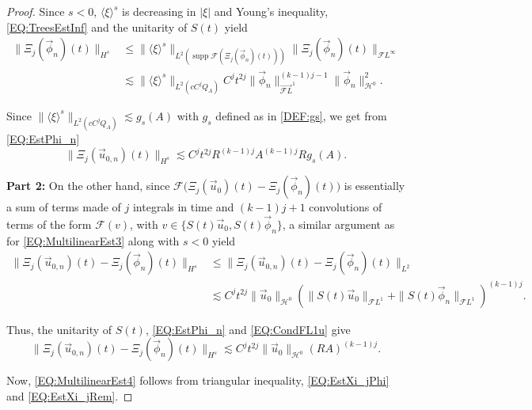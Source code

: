 \documentclass[letterpaper, 11pt,  reqno]{amsart}
\DeclareMathOperator*{\supp}{supp}
\newcommand{\1}{\hspace{0.5mm}\text{I}\hspace{0.5mm}}
\newcommand{\noi}{\noindent}
\newcommand{\FL}{\mathcal{F}L} %
\newcommand{\FLv}{\overrightarrow{\mathcal{F}L}}
\renewcommand{\H}{\mathcal{H}}
\newcommand{\F}{\mathcal{F}}
\newcommand{\les}{\lesssim}
\newcommand{\jb}[1]
{\langle #1 \rangle}
\numberwithin{equation}{section}
\numberwithin{theorem}{section}
\newcommand{\abs}[1]{\lvert#1\rvert}
\begin{document}
\begin{proof}
\noi Since $s < 0$, $\jb{\xi}^s$ is decreasing in $\abs{\xi}$ and Young's inequality, \eqref{EQ:TreesEstInf} and the unitarity of $S(t)$ yield
\begin{align*}
\| \Xi_j (\vec{\phi}_{n})(t) \|_{H^s} & \leq \| \jb{\xi}^s \|_{L^2 (\supp \F( \Xi_j (\vec{\phi}_{n})(t) ) ) } \| \Xi_j (\vec{\phi}_{n})(t) \|_{\FL^\infty} \\
	& \les \| \jb{\xi}^s \|_{L^2 (c C^j Q_A) } C^j t^{2j} \| \vec{\phi}_n \|^{(k-1)j-1}_{\FLv^1} \| \vec{\phi}_n \|^2_{\H^0}.
\end{align*}

\noi Since $\| \jb{\xi}^s \|_{L^2 (c C^j Q_A) } \les g_s(A)$ with $g_s$ defined as in \eqref{DEF:gs}, we get from \eqref{EQ:EstPhi_n}
\begin{equation}
\label{EQ:EstXi_jPhi}
\| \Xi_j (\vec{u}_{0,n})(t) \|_{H^s} \les C^j t^{2j} R^{(k-1)j}A^{(k-1)j} R g_s (A).
\end{equation}

{\bf Part 2:} On the other hand, since $\F\big(\Xi_j (\vec{u}_{0})(t) - \Xi_j (\vec{\phi}_{n})(t)\big)$ is essentially a sum of terms made of $j$ integrals in time and $(k-1)j + 1$ convolutions of terms of the form $\F(v)$, with $v \in \{ S(t)\vec{u}_0 , S(t)\vec{\phi}_n \}$, a similar argument as for \eqref{EQ:MultilinearEst3} along with $s < 0$ yield
\begin{align*}
\|  \Xi_j (\vec{u}_{0,n})(t) - \Xi_j (\vec{\phi}_{n})(t) \|_{H^s} & \leq \|  \Xi_j (\vec{u}_{0,n})(t) - \Xi_j (\vec{\phi}_{n})(t) \|_{L^2} \\
	& \les C^j t^{2j} \| \vec{u}_0 \|_{\H^0} \left( \| S(t)\vec{u}_0\|_{\FL^1} + \| S(t)\vec{\phi}_n \|_{\FL^1} \right)^{(k-1)j}.
\end{align*}

\noi Thus, the unitarity of $S(t)$, \eqref{EQ:EstPhi_n} and \eqref{EQ:CondFL1u} give
\begin{equation}
\label{EQ:EstXi_jRem}
\|  \Xi_j (\vec{u}_{0,n})(t) - \Xi_j (\vec{\phi}_{n})(t) \|_{H^s} \les C^j  t^{2j} \| \vec{u}_0 \|_{\H^0} (RA)^{(k-1)j}.
\end{equation}

\noi Now, \eqref{EQ:MultilinearEst4} follows from triangular inequality, \eqref{EQ:EstXi_jPhi} and \eqref{EQ:EstXi_jRem}.


\end{proof}
\end{document}
